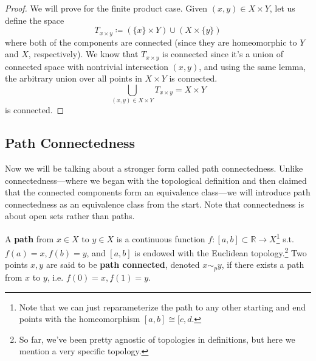   \begin{proof}
    We will prove for the finite product case. Given $(x, y) \in X \times Y$, let us define the space 
    \begin{equation}
      T_{x \times y} \coloneqq (\{x\} \times Y) \cup (X \times \{y\})
    \end{equation}
    where both of the components are connected (since they are homeomorphic to $Y$ and $X$, respectively). We know that $T_{x \times y}$ is connected since it's a union of connected space with nontrivial intersection $(x, y)$, and using the same lemma, the arbitrary union over all points in $X \times Y$ is connected. 
    \begin{equation}
      \bigcup_{(x, y) \in X \times Y} T_{x \times y} = X \times Y
    \end{equation}
    is connected. 
  \end{proof}

\subsection{Path Connectedness} 

  Now we will be talking about a stronger form called path connectedness. Unlike connectedness---where we began with the topological definition and then claimed that the connected components form an equivalence class---we will introduce path connectedness as an equivalence class from the start. Note that connectedness is about open sets rather than paths. 

  \begin{definition}[Path]
    A \textbf{path} from $x \in X$ to $y \in X$ is a continuous function $f: [a, b] \subset \mathbb{R} \rightarrow X$\footnote{Note that we can just reparameterize the path to any other starting and end points with the homeomorphism $[a, b] \cong [c, d$.} s.t. $f(a) = x, f(b) = y$, and $[a, b]$ is endowed with the Euclidean topology.\footnote{So far, we've been pretty agnostic of topologies in definitions, but here we mention a very specific topology.} Two points $x, y$ are said to be \textbf{path connected}, denoted $x \sim_p y$, if there exists a path from $x$ to $y$, i.e. $f(0) = x, f(1) = y$.
  \end{definition} 

